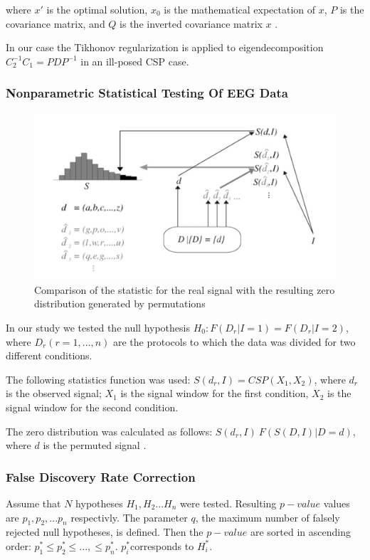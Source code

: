 \documentclass[14pt,a4paper]{scrartcl}
\begin{document}
where $x'$ is the optimal solution, $x_0$ is the mathematical expectation of $x$, $P$ is the covariance matrix, and $Q$ is the inverted covariance matrix $x$ \cite{Tikhonov1963}.

In our case the Tikhonov regularization is applied to eigendecomposition $C^{-1}_{2}C_{1} = PDP^{-1}$ in an ill-posed CSP case.

\subsubsection{Nonparametric Statistical Testing Of EEG Data}
\label{sec:Methods:Data Analysis:Nonparametric Statistical Testing Of EEG Data}

\begin{figure}[H]
\centering
\includegraphics[width=0.7\linewidth]{nps}
\caption{Comparison of the statistic for the real signal with the resulting zero distribution generated by permutations \cite{Maris2007}}\label{fig:nps}
\end{figure}

In our study we tested the null hypothesis $H_0: F(D_r| I=1) =  F(D_r|I=2)$, where $D_r (r = 1, . . . , n)$ are the protocols to which the data was divided for two different conditions. 

The following statistics function was used: $S(d_r, I) = CSP(X_1, X_2)$, where $d_r$ is the observed signal; $X_1$ is the signal window for the first condition, $X_2$ is the signal window for the second condition.

The zero distribution was calculated as follows: $S(d_r, I) ~ F(S(D, I)|{D} = {d})$, where ${d}$ is the permuted signal \cite{Maris2007}. 

\subsubsection{False Discovery Rate Correction}
\label{sec:Methods:Data Analysis:False Discovery Rate Correction}

Assume that $N$ hypotheses $H_1, H_2 ... H_n$ were tested. Resulting $p-value$ values are $p_1, p_2, ... p_n$ respectivly. The parameter $q$, the maximum number of falsely rejected null hypotheses, is defined. Then the $p-value$ are sorted in ascending order: $p^*_1 \leqslant p^*_2 \leqslant ... , \leqslant p^*_n$. $p^*_i$corresponds to $H^*_i$.
\end{document}
